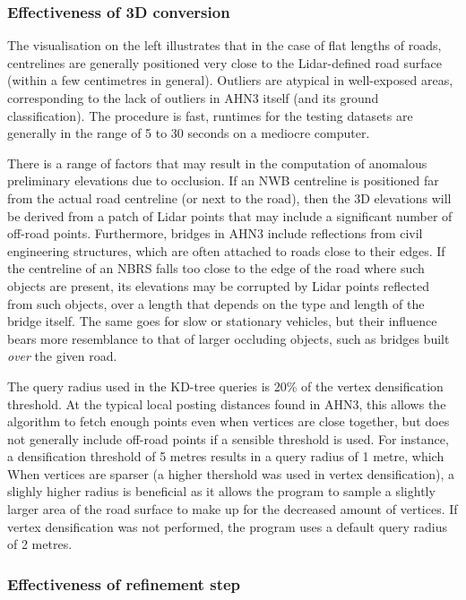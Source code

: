 \subsubsection{Effectiveness of 3D conversion}

The visualisation on the left illustrates that in the case of flat lengths of roads, centrelines are generally positioned very close to the Lidar-defined road surface (within a few centimetres in general). Outliers are atypical in well-exposed areas, corresponding to the lack of outliers in AHN3 itself (and its ground classification). The procedure is fast, runtimes for the testing datasets are generally in the range of 5 to 30 seconds on a mediocre computer.

There is a range of factors that may result in the computation of anomalous preliminary elevations due to occlusion. If an NWB centreline is positioned far from the actual road centreline (or next to the road), then the 3D elevations will be derived from a patch of Lidar points that may include a significant number of off-road points. Furthermore, bridges in AHN3 include reflections from civil engineering structures, which are often attached to roads close to their edges. If the centreline of an NBRS falls too close to the edge of the road where such objects are present, its elevations may be corrupted by Lidar points reflected from such objects, over a length that depends on the type and length of the bridge itself. The same goes for slow or stationary vehicles, but their influence bears more resemblance to that of larger occluding objects, such as bridges built \textit{over} the given road.

The query radius used in the KD-tree queries is 20\% of the vertex densification threshold. At the typical local posting distances found in AHN3, this allows the algorithm to fetch enough points even when vertices are close together, but does not generally include off-road points if a sensible threshold is used. For instance, a densification threshold of 5 metres results in a query radius of 1 metre, which  When vertices are sparser (a higher thershold was used in vertex densification), a slighly higher radius is beneficial as it allows the program to sample a slightly larger area of the road surface to make up for the decreased amount of vertices. If vertex densification was not performed, the program uses a default query radius of 2 metres.

\subsubsection{Effectiveness of refinement step}

